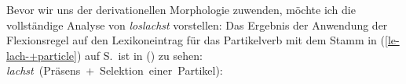 Bevor wir uns der derivationellen Morphologie zuwenden, möchte ich die vollständige
Analyse von \emph{loslachst} vorstellen:
Das Ergebnis der Anwendung der Flexionsregel auf den Lexikoneintrag
für das Partikelverb mit dem Stamm 
in (\ref{le-lach-+particle}) auf S.\,\pageref{le-lach-+particle} ist in () zu sehen:
%
\eas
\label{le-lachst-+particle}%
\mbox{\emph{lachst} (Präsens + Selektion einer Partikel):}\\
\zs
\newpage

